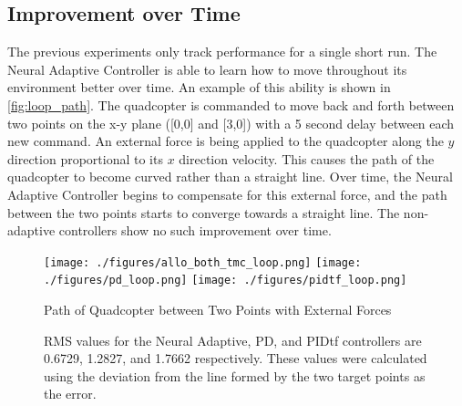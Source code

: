 \documentclass[letterpaper,12pt,titlepage,oneside,final]{book}
\begin{document}



\subsection{Improvement over Time} %

The previous experiments only track performance for a single short run. 
The Neural Adaptive Controller is able to learn how to move throughout its environment better over time.
An example of this ability is shown in \autoref{fig:loop_path}.
The quadcopter is commanded to move back and forth between two points on the x-y plane ([0,0] and [3,0]) with a 5 second delay between each new command.
An external force is being applied to the quadcopter along the $y$ direction proportional to its $x$ direction velocity.
This causes the path of the quadcopter to become curved rather than a straight line.
Over time, the Neural Adaptive Controller begins to compensate for this external force, and the path between the two points starts to converge towards a straight line.
The non-adaptive controllers show no such improvement over time.

\begin{figure}
\centering
\texttt{[image: ./figures/allo\_both\_tmc\_loop.png]}
\texttt{[image: ./figures/pd\_loop.png]}
\texttt{[image: ./figures/pidtf\_loop.png]}
\caption{Path of Quadcopter between Two Points with External Forces} %
\label{fig:loop_path}
\captionsetup{singlelinecheck=off,font=footnotesize}
\caption*{
RMS values for the Neural Adaptive, PD, and PIDtf controllers are 0.6729, 1.2827, and 1.7662 respectively. These values were calculated using the deviation from the line formed by the two target points as the error.}
\end{figure}
\end{document}
